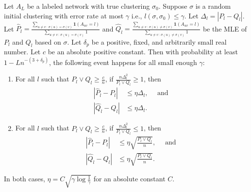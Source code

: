 \documentclass{article}
\begin{document}
\begin{proposition}
\label{prop:estimation_consistency}
Let $A_L$ be a labeled network with true clustering $\sigma_0$. Suppose $\sigma$ is a random initial clustering with error rate at most $\gamma$ i.e., $l(\sigma, \sigma_0) \leq \gamma $. Let $\Delta_l = | P_l - Q_l |$. Let $\hat{P}_l = \frac{\sum_{u \neq v \,:\, \sigma(u)=\sigma(v)} \mathbf{1}(A_{uv} = l) }
                      {\sum_{u \neq v \,:\, \sigma(u) = \sigma(v)} 1}$ and
    $\hat{Q}_l = \frac{\sum_{u \neq v \,:\, \sigma(u) \neq \sigma(v)} \mathbf{1}(A_{uv} = l) }
                      {\sum_{u \neq v \,:\, \sigma(u) \neq \sigma(v)} 1}$ be the MLE of $P_l$ and $Q_l$ based on $\sigma$. Let $\delta_p$ be a positive, fixed, and arbitrarily small real number. Let $c$ be an absolute positive constant. Then with probability at least $1 - L n^{-(3 + \delta_p)}$, the following event happens for all small enough $\gamma$:
\begin{enumerate}
\item For all $l$ such that $P_l \vee Q_l \geq \frac{c}{n}$, if $\frac{n \Delta_l^2}{P_l \vee Q_l} \geq 1$, then
\begin{align*}
 | \hat{P}_l - P_l | &\leq \eta \Delta_l, \quad \text{ and } \\
 | \hat{Q}_l - Q_l | &\leq \eta \Delta_l. 
\end{align*}
\item For all $l$ such that $P_l \vee Q_l \geq \frac{c}{n}$, if $\frac{n \Delta_l^2}{P_l \vee Q_l} \leq 1$, then
\begin{align*}
 | \hat{P}_l - P_l | &\leq \eta \sqrt{ \frac{P_l \vee Q_l}{n}}, \quad \text{ and } \\
 | \hat{Q}_l - Q_l | &\leq \eta \sqrt{ \frac{P_l \vee Q_l}{n}}.
\end{align*}
\end{enumerate}
In both cases,  $\eta = C \sqrt{\gamma \log \frac{1}{\gamma}}$ for an absolute constant $C$.
\end{proposition}
\end{document}
